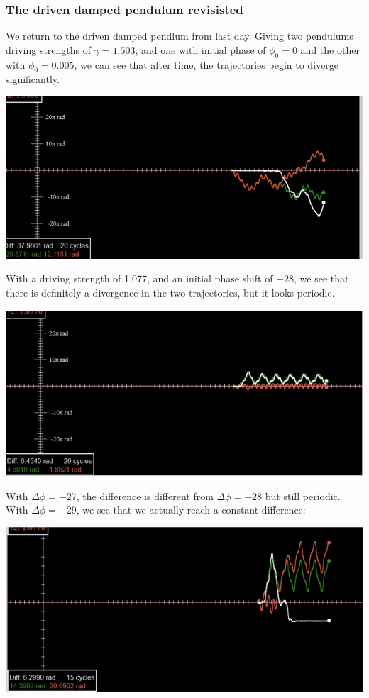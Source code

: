 \subsubsection{The driven damped pendulum revisisted}
We return to the driven damped pendlum from last day. Giving two pendulums driving strengths of $\gamma = 1.503$, and one with initial phase of $\phi_0 = 0$ and the other with $\phi_0 = 0.005$, we can see that after time, the trajectories begin to diverge significantly.
\begin{center}
    \includegraphics[scale=0.7]{Lecture-33/l33-img1.png}
\end{center}
With a driving strength of 1.077, and an initial phase shift of $-28$, we see that there is definitely a divergence in the two trajectories, but it looks periodic. 
\begin{center}
    \includegraphics[scale=0.7]{Lecture-33/l33-img2.png}
\end{center}
With $\Delta \phi = -27$, the difference is different from $\Delta \phi = -28$ but still periodic. With $\Delta \phi = -29$, we see that we actually reach a constant difference:
\begin{center}
    \includegraphics[scale=0.7]{Lecture-33/l33-img3.png}
\end{center}
